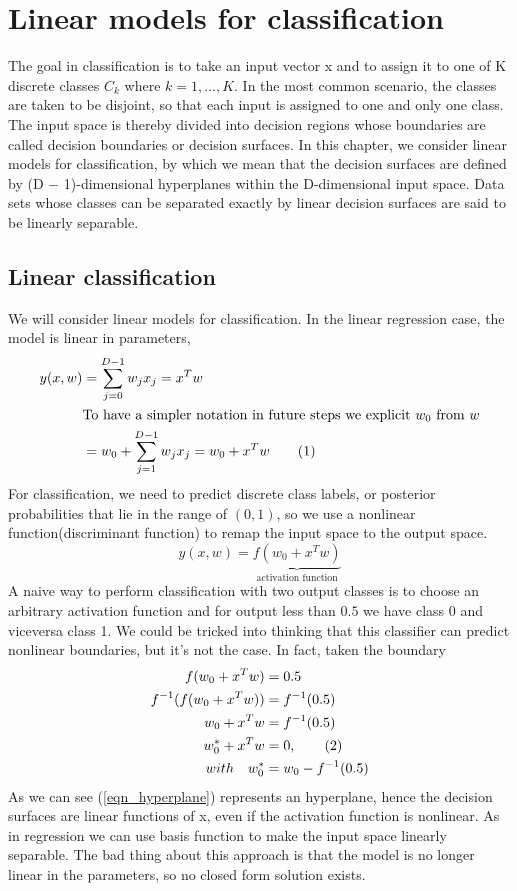 \documentclass[main.tex]{subfiles}
\newcommand\numberthis{\addtocounter{equation}{1}\tag{\theequation}}
\begin{document}
\section{Linear models for classification}
The goal in classification is to take an
input vector x and to assign it to one of K discrete classes $C_k$ where $k = 1,...,K$.
In the most common scenario, the classes are taken to be disjoint, so that each input is
assigned to one and only one class. The input space is thereby divided into decision
regions whose boundaries are called decision boundaries or decision surfaces. In
this chapter, we consider linear models for classification, by which we mean that the
decision surfaces are defined by (D − 1)-dimensional hyperplanes within the D-dimensional input space. Data
sets whose classes can be separated exactly by linear decision surfaces are said to be
linearly separable.

\subsection{Linear classification}
We will consider linear models for classification. In the linear regression case, the model is linear in parameters,
\begin{align*}
    y(x,w) &= \sum_{j=0}^{D-1} w_jx_j = x^Tw \\
    & \text{To have a simpler notation in future steps we explicit }w_0 \text{ from } w \\
    &= w_0 + \sum_{j=1}^{D-1} w_jx_j = w_0 + x^Tw \numberthis
\end{align*}
For classification, we need to predict discrete class labels, or posterior probabilities that lie in the range of $(0,1)$, so we use a nonlinear function(discriminant function) to remap the input space to the output space.
\begin{equation*}
    y(x,w) = \underbrace{f(w_0 + x^Tw)}_{\text{activation function}}
\end{equation*}
A naive way to perform classification with two output classes is to choose an arbitrary activation function and for output less than $0.5$ we have class 0 and viceversa class 1. We could be tricked into thinking that this classifier can predict nonlinear boundaries, but it's not the case. In fact, taken the boundary
\begin{align*}
    f(w_0 + x^Tw) &= 0.5 \\
    f^{-1}(f(w_0 + x^Tw)) &= f^{-1}(0.5) \\
    w_0 + x^Tw &= f^{-1}(0.5) \\
    w_0^* + x^Tw &= 0, \numberthis \label{eqn_hyperplane} \\
    with \quad w_0^* &= w_0 - f^{-1}(0.5)
\end{align*}
As we can see (\ref{eqn_hyperplane}) represents an hyperplane, hence the decision surfaces are linear functions of x, even if the activation function is nonlinear. As in regression we can use basis function to make the input space linearly separable. The bad thing about this approach is that the model is no longer linear in the parameters, so no closed form solution exists.
\end{document}
